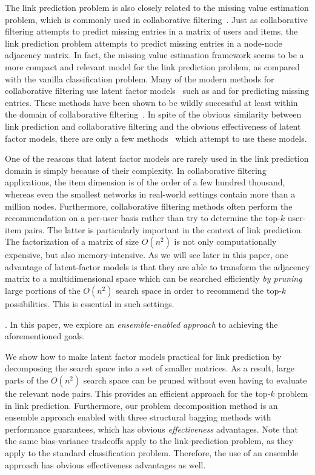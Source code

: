 The link prediction problem is also closely related to the missing value
estimation problem, which is commonly used in collaborative
filtering~\cite{adom}.  Just as collaborative filtering attempts to
predict missing entries in a matrix of users and items, the link
prediction problem attempts to predict missing entries in a
node-node adjacency matrix. In fact, the missing value estimation
framework seems to be a more compact and relevant model for the link
prediction problem, as compared with the vanilla classification
problem.  Many of the modern methods for collaborative filtering use
latent factor models~\cite{conceptualr,web} such as \SVD and
\NMF for predicting missing entries. These methods have been
shown to be wildly successful at least within the domain of
collaborative filtering~\cite{web}. In spite of the obvious
similarity between link prediction and collaborative filtering and
the obvious effectiveness of latent factor models, there are only a
few methods~\cite{menon} which attempt to use these models.

One of the reasons that latent factor models are rarely used in the
link prediction domain is simply because of their complexity. In
collaborative filtering applications, the item dimension is of the
order of a few hundred thousand, whereas even the smallest networks
in real-world settings contain more than a million nodes.
Furthermore, collaborative filtering methods  often perform the
recommendation on a per-user basis rather than try to determine
the top-$k$ user-item pairs.  The latter is particularly important
in the context of link prediction. The factorization of a matrix of
size $O(n^2)$ is not only computationally expensive, but also
memory-intensive.  As we will see later in this paper, one advantage
of  latent-factor models is that they are able to  transform the
adjacency matrix to a multidimensional space which can be searched
efficiently {\em by pruning} large portions of the $O(n^2)$ search
space in order to recommend the top-$k$ possibilities. This is
essential in such settings.

. In this paper, we explore an {\em ensemble-enabled approach} to
achieving the aforementioned goals.


We show how to make latent factor models
practical for link prediction by decomposing the search space into a
 set of smaller matrices. As a result, large parts of the $O(n^2)$
search space can be pruned without even having to evaluate the
relevant node pairs. This provides an efficient approach for the
top-$k$ problem in link prediction.  Furthermore, our problem
decomposition method is an ensemble approach enabled with three structural bagging methods with performance guarantees, which has obvious {\em
effectiveness} advantages. Note that the same bias-variance
tradeoffs apply to the link-prediction problem, as they apply to the
standard classification problem. Therefore, the use of an ensemble
approach has obvious effectiveness advantages as well.

